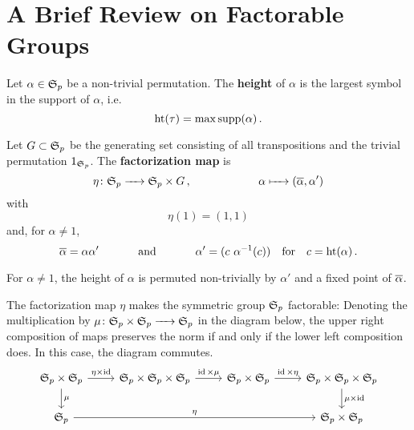 \section{A Brief Review on Factorable Groups}
\label{notation:factorable_groups}

\begin{defi}
    \label{notation:height}
    Let $\alpha \in \Symgrp_p$ be a non-trivial permutation.
    The \textbf{height} of $\alpha$ is the largest symbol in the support of $\alpha$, i.e.\ 
    \[
        \height(\tau) = \max \supp(\alpha) \,.
    \]
\end{defi}

\begin{defi}
    \label{notation:factorization_map}
    Let $G \subset \SymGr_p$ be the generating set consisting of all transpositions and the trivial permutation $1_{\SymGr_p}$.
    The {\bfseries factorization map} is
    \[
        \eta \colon \SymGr_p \to \SymGr_p \times G\,, \mspc{}{30} \alpha \mapsto (\ov\alpha, \alpha') 
    \]
    with
    \[
        \eta(1) = (1,1)
    \]
    and, for $\alpha \neq 1$,
    \[
        \ov\alpha = \alpha \alpha' \mspc{and}{35} \alpha' = (c\ \alpha^{-1}(c)) \mspc{for}{10} c = \hgt(\alpha) \,.
    \]
\end{defi}

\begin{rem}
    \label{notation:height_rem}
    For $\alpha \neq 1$, the height of $\alpha$ is permuted non-trivially by $\alpha'$ and a fixed point of $\ov\alpha$.
\end{rem}

\begin{thm*}
    The factorization map $\eta$ makes the symmetric group $\Symgrp_p$ factorable:
    Denoting the multiplication by $\mu \colon \SymGr_p \times \SymGr_p \to \SymGr_p$ in the diagram below,
    the upper right composition of maps preserves the norm if and only if the lower left composition does.
    In this case, the diagram commutes.
    \[
        \begin{tikzcd}
            \SymGr_p \times \SymGr_p  \arrow{d}{\mu} \arrow{r}{\eta \times \id} & \SymGr_p \times \SymGr_p \times \SymGr_p \arrow{r}{\id \times \mu}    & \SymGr_p \times \SymGr_p \arrow{r}{\id \times \eta}   & \SymGr_p \times \SymGr_p \times \SymGr_p \arrow{d}{\mu \times \id} \\
            \SymGr_p \arrow{rrr}{\eta}                                          &                                                                       &                                                       & \SymGr_p \times \SymGr_p
        \end{tikzcd}
    \]
\end{thm*}

